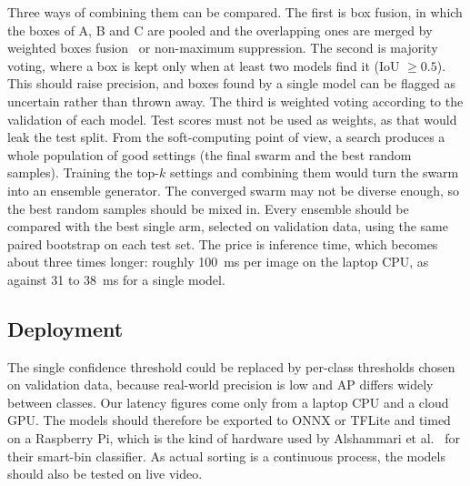 Three ways of combining them can be compared. The first is box fusion, in which the boxes of A, B and C are pooled and the overlapping ones are merged by weighted boxes fusion~\cite{solovyev2021weighted} or non-maximum suppression. The second is majority voting, where a box is kept only when at least two models find it (IoU $\ge 0.5$). This should raise precision, and boxes found by a single model can be flagged as uncertain rather than thrown away. The third is weighted voting according to the validation \mapfifty of each model. Test scores must not be used as weights, as that would leak the test split. From the soft-computing point of view, a search produces a whole population of good settings (the final swarm and the best random samples). Training the top-$k$ settings and combining them would turn the swarm into an ensemble generator. The converged swarm may not be diverse enough, so the best random samples should be mixed in. Every ensemble should be compared with the best single arm, selected on validation data, using the same paired bootstrap on each test set. The price is inference time, which becomes about three times longer: roughly 100~ms per image on the laptop CPU, as against 31 to 38~ms for a single \genone model.

\subsection{Deployment}
\label{subsec:fw-deploy}

The single confidence threshold could be replaced by per-class thresholds chosen on validation data, because real-world precision is low and AP differs widely between classes. Our latency figures come only from a laptop CPU and a cloud GPU. The models should therefore be exported to ONNX or TFLite and timed on a Raspberry Pi, which is the kind of hardware used by Alshammari et al.~\cite{alshammari2025smart} for their smart-bin classifier. As actual sorting is a continuous process, the models should also be tested on live video.

